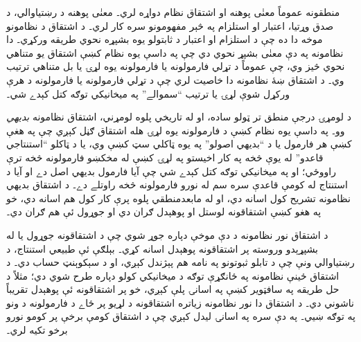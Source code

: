 \documentclass[12pt,a4paper,oneside]{report}
\theoremstyle{definition}
\begin{document}
\label{olpseg:OLP-0064-B006:start}
منطقونه عموماً معنٰی پوهنه او اشتقاق نظام دواړه لري۔ معنٰی
پوهنه د رښتياوالي، د صدق وړتيا، اعتبار او استلزام په څېر مفهومونو
سره کار لري۔ د اشتقاق د نظامونو موخه دا ده چې د استلزام او
اعتبار د ثابتولو يوه بشپړه نحوي طريقه ورکړي۔ دا نظامونه په دې معنٰی
بشپړ نحوي دي چې په داسې يوه نظام کښې اشتقاق يو متناهي نحوي
څيز وي، چې عموماً د تړلي فارمولونه يا فارمولونه يوه لړۍ يا بل
متناهي ترتيب وي۔ د اشتقاق ښۀ نظامونه دا خاصيت لري چې د
تړلي فارمولونه يا فارمولونه د هرې ورکړل شوې لړۍ يا ترتيب
``سموالے'' په ميخانيکي توګه کتل کېدے شي۔
\label{olpseg:OLP-0064-B006:end}

\label{olpseg:OLP-0064-B007:start}
د لومړۍ درجې منطق تر ټولو ساده، او له تاريخي پلوه لومړني،
اشتقاق نظامونه \emph{بديهي} وو۔ په داسې يوه نظام کښې د
فارمولونه يوه لړۍ هله اشتقاق ګڼل کېږي چې په هغې کښې هر
فارمول يا د ``بديهي اصولو'' په يوه ټاکلي سټ کښې وي، يا د ټاکلو
``استنتاجي قاعدو'' له يوې څخه په کار اخيستو په لړۍ کښې له مخکښو
فارمولونه څخه ترې راووځي؛ او په ميخانيکي توګه کتل کېدے شي چې آيا
فارمول بديهي اصل دے او آيا د استنتاج له کومې قاعدې سره سم له
نورو فارمولونه څخه راوتلے دے۔ د اشتقاق بديهي نظامونه
تشريح کول اسانه دي، او له مابعدمنطقي پلوه پرې کار کول هم اسانه دي،
خو په هغو کښې اشتقاقونه لوستل او پوهېدل ګران دي او جوړول ئې هم
ګران دي۔
\label{olpseg:OLP-0064-B007:end}

\label{olpseg:OLP-0064-B008:start}
د اشتقاق نور نظامونه د دې موخې دپاره جوړ شوي چې د
اشتقاقونه جوړول يا له بشپړېدو وروسته پر اشتقاقونه
پوهېدل اسانه کړي۔
بېلګې ئې طبيعي استنتاج، د رښتياوالي ونې چې د تابلو ثبوتونو په نامه
هم پېژندل کېږي، او د سېکوېنټ حساب دي۔ د اشتقاق ځينې نظامونه
په ځانګړې توګه د ميخانيکي کولو دپاره طرح شوي دي؛ مثلاً د حل طريقه
په سافټوير کښې په اسانۍ پلې کېږي، خو پر اشتقاقونه ئې پوهېدل
تقريباً ناشوني دي۔ د اشتقاق دا نور نظامونه زياتره
اشتقاقونه د لړيو پر ځاے د فارمولونه د ونو په توګه ښيي۔ په
دې سره په اسانۍ ليدل کېږي چې د اشتقاق کومې برخې پر کومو
نورو برخو تکيه لري۔
\label{olpseg:OLP-0064-B008:end}
\end{document}
